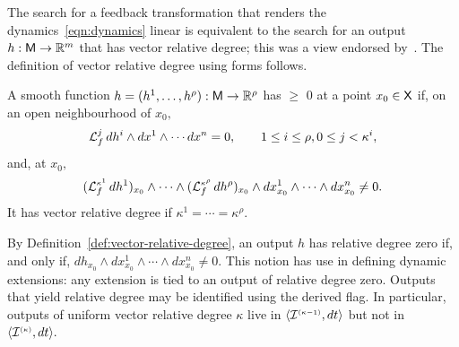 \documentclass[a4paper]{ifacconf}
\begin{document}
The search for a feedback transformation that renders the dynamics~\eqref{eqn:dynamics} linear is equivalent to the search for an output \(h: \mathsf{M} \to \mathbb{R}^m\) that has vector relative degree;
this was a view endorsed by~\cite{isidori_nonlinear_1995}.
The definition of vector relative degree using forms follows.

%
\begin{defn}%
  \label{def:vector-relative-degree}
  A smooth function \(h = (h^1,\ldots, h^\rho): \mathsf{M} \to \mathbb{R}^\rho\) has  \(\geq\) \(0\) at a point \(x_0 \in \mathsf{X}\) if, on an open neighbourhood of \(x_0,\)
  \[
    \operatorname{\mathcal{L}}_{f}^{j} dh^i \wedge dx^{1} \wedge \cdots dx^{n} = 0, \qquad 1\leq i \leq \rho, 0 \leq j < \kappa^i,
  \]
  and, at \(x_0,\)
  \[
    (\operatorname{\mathcal{L}}_{f}^{\smash{\scriptscriptstyle\kappa^1}}dh^1)_{x_0} \wedge \cdots \wedge (\operatorname{\mathcal{L}}_{f}^{\smash{\scriptscriptstyle\kappa^\rho}}dh^\rho)_{x_0} \wedge
    dx^{1}_{x_0} \wedge \cdots \wedge dx^{n}_{x_0} \neq 0.
  \]
  It has  vector relative degree if \(\kappa^1 = \cdots = \kappa^\rho.\)
\end{defn}
%
By Definition~\ref{def:vector-relative-degree}, an output \(h\) has relative degree zero if, and only if,
\(
    dh_{x_0} \wedge dx^{1}_{x_0} \wedge \cdots \wedge dx^{n}_{x_0} \neq 0.
\)
This notion has use in defining dynamic extensions:
any extension is tied to an output of relative degree zero.
%
Outputs that yield relative degree may be identified using the derived flag.
In particular, outputs of uniform vector relative degree \(\kappa\) live in \(\langle \mathcal{I}^{\smash{\scriptscriptstyle(\kappa-1)}}, dt \rangle\) but not in \(\langle \mathcal{I}^{\smash{\scriptscriptstyle(\kappa)}}, dt \rangle.\)
\end{document}
